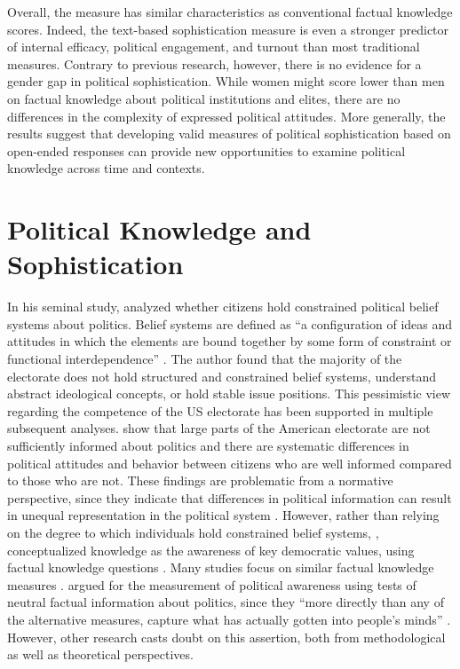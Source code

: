 \documentclass[12pt]{article}
\begin{document}
Overall, the measure has similar characteristics as conventional factual knowledge scores. Indeed, the text-based sophistication measure is even a stronger predictor of internal efficacy, political engagement, and turnout than most traditional measures. Contrary to previous research, however, there is no evidence for a gender gap in political sophistication. While women might score lower than men on factual knowledge about political institutions and elites, there are no differences in the complexity of expressed political attitudes. More generally, the results suggest that developing valid measures of political sophistication based on open-ended responses can provide new opportunities to examine political knowledge across time and contexts. 


\section*{Political Knowledge and Sophistication}

In his seminal study, \citet{converse1964nature} analyzed whether citizens hold constrained political belief systems about politics. Belief systems are defined as ``a configuration of ideas and attitudes in which the elements are bound together by some form of constraint or functional interdependence'' \citep[207]{converse1964nature}. The author found that the majority of the electorate does not hold structured and constrained belief systems, understand abstract ideological concepts, or hold stable issue positions. This pessimistic view regarding the competence of the US electorate has been supported in multiple subsequent analyses. \citet{carpini1996americans} show that large parts of the American electorate are not sufficiently informed about politics and there are systematic differences in political attitudes and behavior between citizens who are well informed compared to those who are not. These findings are problematic from a normative perspective, since they indicate that differences in political information can result in unequal representation in the political system \citep[see also][]{althaus1998information,kuklinski2000misinformation,gilens2001political}. However, rather than relying on the degree to which individuals hold constrained belief systems, \citet{carpini1996americans}, conceptualized knowledge as the awareness of key democratic values, using factual knowledge questions \citep[see also][]{carpini1993measuring}. Many studies focus on similar factual knowledge measures \citep[e.g.][]{zaller1991information,jacoby1995structure,gomez2001political}.  \citet{zaller1992nature} argued for the measurement of political awareness using tests of neutral factual information about politics, since they ``more directly than any of the alternative measures, capture what has actually gotten into people’s minds'' \citep[21]{zaller1992nature}. However, other research casts doubt on this assertion, both from methodological as well as theoretical perspectives.
\end{document}
